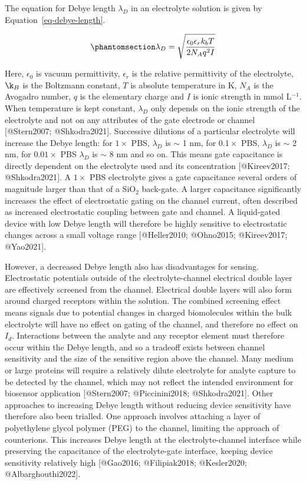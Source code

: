 \documentclass[
  letterpaper,
  DIV=11,
  numbers=noendperiod]{scrartcl}
\begin{document}
The equation for Debye length \(\lambda_D\) in an electrolyte solution
is given by Equation~\ref{eq-debye-length}.

\begin{equation}\phantomsection\label{eq-debye-length}{
\lambda_D = \sqrt{\frac{\epsilon_0\epsilon_rk_bT}{2N_Aq^2I}}
}\end{equation}

Here, \(\epsilon_0\) is vacuum permittivity, \(\epsilon_r\) is the
relative permittivity of the electrolyte, \(\k_B\) is the Boltzmann
constant, \(T\) is absolute temperature in K, \(N_A\) is the Avogadro
number, \(q\) is the elementary charge and \(I\) is ionic strength in
mmol L\(^{-1}\). When temperature is kept constant, \(\lambda_D\) only
depends on the ionic strength of the electrolyte and not on any
attributes of the gate electrode or channel {[}@Stern2007;
@Shkodra2021{]}. Successive dilutions of a particular electrolyte will
increase the Debye length: for \(1 \times\) PBS, \(\lambda_D\) is
\(\sim\) 1 nm, for \(0.1 \times\) PBS, \(\lambda_D\) is \(\sim\) 2 nm,
for \(0.01 \times\) PBS \(\lambda_D\) is \(\sim\) 8 nm and so on. This
means gate capacitance is directly dependent on the electrolyte used and
its concentration {[}@Kireev2017; @Shkodra2021{]}. A \(1 \times\) PBS
electrolyte gives a gate capacitance several orders of magnitude larger
than that of a SiO\(_2\) back-gate. A larger capacitance significantly
increases the effect of electrostatic gating on the channel current,
often described as increased electrostatic coupling between gate and
channel. A liquid-gated device with low Debye length will therefore be
highly sensitive to electrostatic changes across a small voltage range
{[}@Heller2010; @Ohno2015; @Kireev2017; @Yao2021{]}.

However, a decreased Debye length also has disadvantages for sensing.
Electrostatic potentials outside of the electrolyte-channel electrical
double layer are effectively screened from the channel. Electrical
double layers will also form around charged receptors within the
solution. The combined screening effect means signals due to potential
changes in charged biomolecules within the bulk electrolyte will have no
effect on gating of the channel, and therefore no effect on \(I_d\).
Interactions between the analyte and any receptor element must therefore
occur within the Debye length, and so a tradeoff exists between channel
sensitivity and the size of the sensitive region above the channel. Many
medium or large proteins will require a relatively dilute electrolyte
for analyte capture to be detected by the channel, which may not reflect
the intended environment for biosensor application {[}@Stern2007;
@Piccinini2018; @Shkodra2021{]}. Other approaches to increasing Debye
length without reducing device sensitivity have therefore also been
trialled. One approach involves attaching a layer of polyethylene glycol
polymer (PEG) to the channel, limiting the approach of counterions. This
increases Debye length at the electrolyte-channel interface while
preserving the capacitance of the electrolyte-gate interface, keeping
device sensitivity relatively high {[}@Gao2016; @Filipiak2018;
@Kesler2020; @Albarghouthi2022{]}.
\end{document}
